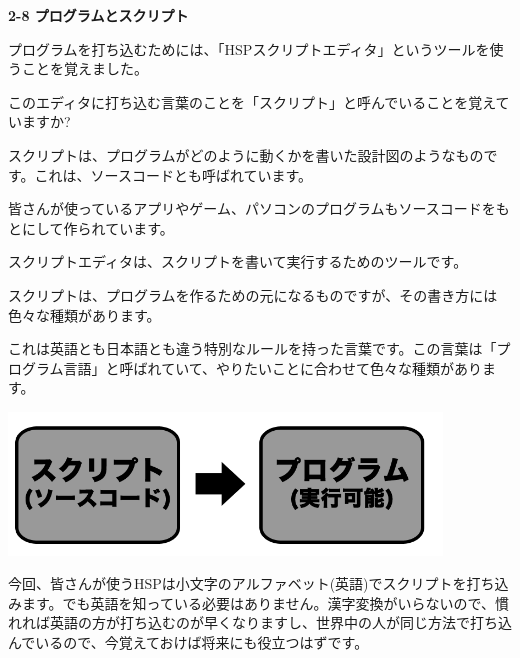 \documentclass[a4paper,dvipdfmx]{jarticle}
\begin{document}
\bigskip

{\bfseries
2-8 プログラムとスクリプト}


\bigskip

プログラムを打ち込むためには、「HSPスクリプトエディタ」というツールを使うことを覚えました。

このエディタに打ち込む言葉のことを「スクリプト」と呼んでいることを覚えていますか?

スクリプトは、プログラムがどのように動くかを書いた設計図のようなものです。これは、ソースコードとも呼ばれています。

皆さんが使っているアプリやゲーム、パソコンのプログラムもソースコードをもとにして作られています。

スクリプトエディタは、スクリプトを書いて実行するためのツールです。


\bigskip


\bigskip

スクリプトは、プログラムを作るための元になるものですが、その書き方には色々な種類があります。

これは英語とも日本語とも違う特別なルールを持った言葉です。この言葉は「プログラム言語」と呼ばれていて、やりたいことに合わせて色々な種類があります。



\begin{center}
\includegraphics[width=11.509cm,height=3.803cm]{text02-img/text02-img022.png}

\end{center}

\bigskip


\bigskip


\bigskip


\bigskip


\bigskip


\bigskip


\bigskip


\bigskip


\bigskip


\bigskip

今回、皆さんが使うHSPは小文字のアルファベット(英語)でスクリプトを打ち込みます。でも英語を知っている必要はありません。漢字変換がいらないので、慣れれば英語の方が打ち込むのが早くなりますし、世界中の人が同じ方法で打ち込んでいるので、今覚えておけば将来にも役立つはずです。
\end{document}

